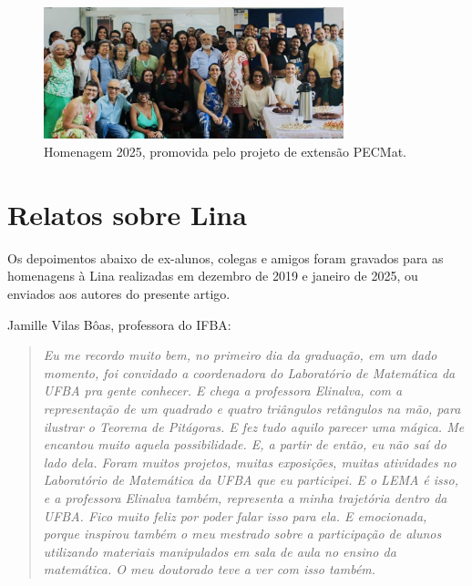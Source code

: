 \documentclass{hipatia}
\begin{document}
\begin{figure}[htb!]
\includegraphics[width=8.7cm]{2025.jpg}
\caption{Homenagem 2025, promovida pelo projeto de extensão PECMat.}   
\end{figure}



\section{Relatos sobre Lina}

Os depoimentos abaixo de ex-alunos, colegas e amigos foram gravados para as homenagens à Lina realizadas em dezembro de 2019 e janeiro de 2025, ou enviados aos autores do presente artigo.

Jamille Vilas Bôas, professora do IFBA: \begin{quote}
\textit{Eu me recordo muito bem, no primeiro dia da graduação, em um dado momento, foi convidado a coordenadora do Laboratório de Matemática da UFBA pra gente conhecer. E chega a professora Elinalva, com a representação de um quadrado e quatro triângulos retângulos na mão, para ilustrar o Teorema de Pitágoras. E fez tudo aquilo parecer uma mágica. Me encantou muito aquela possibilidade. E, a partir de então, eu não saí do lado dela. Foram muitos projetos,  muitas exposições, muitas atividades no
Laboratório de Matemática da UFBA que eu participei.
E o LEMA é isso, e a professora Elinalva também, representa a minha trajetória dentro da UFBA. Fico muito feliz por poder falar isso para ela. E emocionada, porque inspirou também o meu mestrado sobre a
participação de alunos utilizando materiais manipulados em sala de aula no ensino da matemática. O meu doutorado teve a ver com isso também.}
\end{quote}
\end{document}
